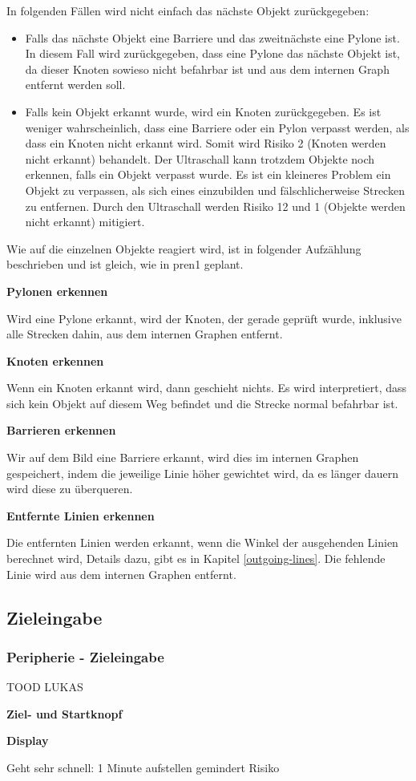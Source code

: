 In folgenden Fällen wird nicht einfach das nächste Objekt zurückgegeben:

\begin{itemize}
    \item Falls das nächste Objekt eine Barriere und das zweitnächste eine Pylone ist. In diesem Fall wird zurückgegeben, dass eine Pylone das nächste Objekt ist, da dieser Knoten sowieso nicht befahrbar ist und aus dem internen Graph entfernt werden soll.
    \item Falls kein Objekt erkannt wurde, wird ein Knoten zurückgegeben. Es ist weniger wahrscheinlich, dass eine Barriere oder ein Pylon verpasst werden, als dass ein Knoten nicht erkannt wird. Somit wird Risiko 2 (Knoten werden nicht erkannt) behandelt. Der Ultraschall kann trotzdem Objekte noch erkennen, falls ein Objekt verpasst wurde. Es ist ein kleineres Problem ein Objekt zu verpassen, als sich eines einzubilden und fälschlicherweise Strecken zu entfernen. Durch den Ultraschall werden Risiko 12 und 1 (Objekte werden nicht erkannt) mitigiert.
\end{itemize}


Wie auf die einzelnen Objekte reagiert wird, ist in folgender Aufzählung beschrieben und ist gleich, wie in \acrshort{pren1} geplant.

\textbf{Pylonen erkennen}

Wird eine Pylone erkannt, wird der Knoten, der gerade geprüft wurde, inklusive alle Strecken dahin, aus dem internen Graphen entfernt.

\textbf{Knoten erkennen}

Wenn ein Knoten erkannt wird, dann geschieht nichts. Es wird interpretiert, dass sich kein Objekt auf diesem Weg befindet und die Strecke normal befahrbar ist.

\textbf{Barrieren erkennen}

Wir auf dem Bild eine Barriere erkannt, wird dies im internen Graphen gespeichert, indem die jeweilige Linie höher gewichtet wird, da es länger dauern wird diese zu überqueren.

\textbf{Entfernte Linien erkennen}

Die entfernten Linien werden erkannt, wenn die Winkel der ausgehenden Linien berechnet wird, Details dazu, gibt es in Kapitel \ref{outgoing-lines}. Die fehlende Linie wird aus dem internen Graphen entfernt.

\newpage
\subsection{Zieleingabe}

\subsubsection{Peripherie - Zieleingabe}
\label{zieleingabe}

TOOD LUKAS


\textbf{Ziel- und Startknopf}

\textbf{Display}

Geht sehr schnell: 1 Minute aufstellen gemindert Risiko